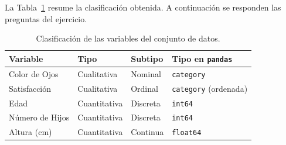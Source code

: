 \documentclass[11pt,letterpaper]{article}
\begin{document}
La Tabla~\ref{tab:clasificacion} resume la clasificación obtenida. A continuación se responden las preguntas del ejercicio.

\begin{table}[htbp]
\centering
\caption{Clasificación de las variables del conjunto de datos.}
\label{tab:clasificacion}
\begin{tabular}{llll}
\hline
\textbf{Variable} & \textbf{Tipo} & \textbf{Subtipo} & \textbf{Tipo en \texttt{pandas}} \\
\hline
Color de Ojos   & Cualitativa  & Nominal  & \texttt{category} \\
Satisfacción    & Cualitativa  & Ordinal  & \texttt{category} (ordenada) \\
Edad            & Cuantitativa & Discreta & \texttt{int64} \\
Número de Hijos & Cuantitativa & Discreta & \texttt{int64} \\
Altura (cm)     & Cuantitativa & Continua & \texttt{float64} \\
\hline
\end{tabular}
\end{table}
\end{document}
